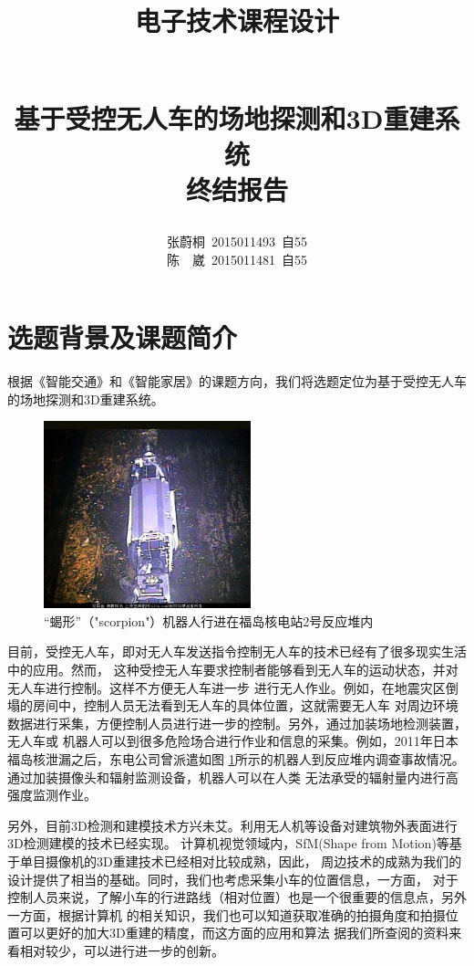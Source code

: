\documentclass[a4paper]{paper}
\title{
    \begin{large}电子技术课程设计\end{large}\\
    基于受控无人车的场地探测和3D重建系统\\
    终结报告
}
\author{
    张蔚桐\ 2015011493\ 自55\\
    陈　崴\ 2015011481\ 自55
}
\begin{document}
\newcommand{\tabincell}[2]{\begin{tabular}{@{}#1@{}}#2\end{tabular}}
\maketitle
\tableofcontents    
\clearpage
\section{选题背景及课题简介}
根据《智能交通》和《智能家居》的课题方向，我们将选题定位为基于受控无人车的场地探测和3D重建系统。

\begin{figure}
    \centering
    \includegraphics[width = 60mm]{../preview/Robo.jpg}
    \caption{“蝎形”（"scorpion"）机器人行进在福岛核电站2号反应堆内}
    \label{Robo}
\end{figure}
目前，受控无人车，即对无人车发送指令控制无人车的技术已经有了很多现实生活中的应用。然而，
这种受控无人车要求控制者能够看到无人车的运动状态，并对无人车进行控制。这样不方便无人车进一步
进行无人作业。例如，在地震灾区倒塌的房间中，控制人员无法看到无人车的具体位置，这就需要无人车
对周边环境数据进行采集，方便控制人员进行进一步的控制。另外，通过加装场地检测装置，无人车或
机器人可以到很多危险场合进行作业和信息的采集。例如，2011年日本福岛核泄漏之后，东电公司曾派遣如图
\ref{Robo}所示的机器人到反应堆内调查事故情况。通过加装摄像头和辐射监测设备，机器人可以在人类
无法承受的辐射量内进行高强度监测作业。

另外，目前3D检测和建模技术方兴未艾。利用无人机等设备对建筑物外表面进行3D检测建模的技术已经实现。
计算机视觉领域内，SfM(Shape from Motion)等基于单目摄像机的3D重建技术已经相对比较成熟，因此，
周边技术的成熟为我们的设计提供了相当的基础。同时，我们也考虑采集小车的位置信息，一方面，
对于控制人员来说，了解小车的行进路线（相对位置）也是一个很重要的信息点，另外一方面，根据计算机
的相关知识，我们也可以知道获取准确的拍摄角度和拍摄位置可以更好的加大3D重建的精度，而这方面的应用和算法
据我们所查阅的资料来看相对较少，可以进行进一步的创新。
\end{document}
